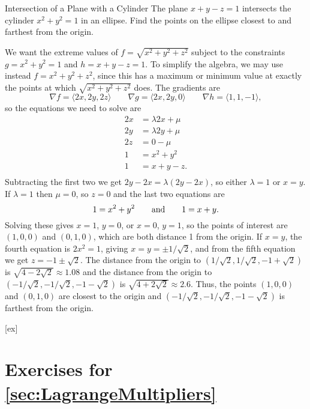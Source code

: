 \begin{example}{Intersection of a Plane with a Cylinder}{}
The plane $x+y-z=1$ intersects the cylinder $x^2+y^2=1$ in an
ellipse. Find the points on the ellipse closest to and farthest from
the origin.
\end{example}
\begin{solution}
We want the extreme values of $f=\sqrt{x^2+y^2+z^2}$ subject to the
constraints  $g=x^2+y^2=1$ and $h=x+y-z=1$. To simplify the algebra,
we may use instead $f=x^2+y^2+z^2$, since this has a maximum or
minimum value at exactly the points at which $\sqrt{x^2+y^2+z^2}$ does.
The gradients are
$$\nabla f =\langle 2x,2y,2z\rangle\qquad
\nabla g = \langle 2x,2y,0\rangle\qquad
\nabla h = \langle 1,1,-1\rangle,$$
so the equations we need to solve are
\begin{align*}
2x&=\lambda 2x+\mu	\\
2y&=\lambda 2y+\mu	\\
2z&=0-\mu	\\
1&=x^2+y^2	\\
1&=x+y-z.	\\
\end{align*}
Subtracting the first two we get
$2y-2x=\lambda(2y-2x)$, so either $\lambda=1$ or $x=y$. If $\lambda=1$
then $\mu=0$, so $z=0$ and the last two equations are
$$1=x^2+y^2\qquad\hbox{and}\qquad 1=x+y.$$
Solving these gives $x=1$, $y=0$, or $x=0$, $y=1$, so the points of
interest are $(1,0,0)$ and $(0,1,0)$, which are both distance 1 from
the origin. If $x=y$, the fourth equation is $2x^2=1$, giving 
$x=y=\pm1/\sqrt2$, and from the fifth equation we get
$z=-1\pm\sqrt2$. The distance from the origin to 
$(1/\sqrt2,1/\sqrt2,-1+\sqrt2)$ is $\sqrt{4-2\sqrt2}\approx 1.08$ and
the distance from the origin to 
$(-1/\sqrt2,-1/\sqrt2,-1-\sqrt2)$ is $\sqrt{4+2\sqrt2}\approx 2.6$.
Thus, the points $(1,0,0)$ and $(0,1,0)$ are closest to the origin and 
$(-1/\sqrt2,-1/\sqrt2,-1-\sqrt2)$ is farthest from the origin.
\end{solution}


[ex]
\section*{Exercises for \ref{sec:LagrangeMultipliers}}

